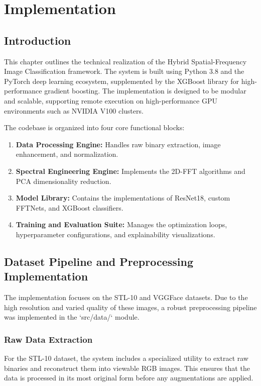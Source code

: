 \chapter{Implementation}
\label{ch:implementation}

\section{Introduction}

This chapter outlines the technical realization of the Hybrid Spatial-Frequency Image Classification framework. The system is built using Python 3.8 and the PyTorch deep learning ecosystem, supplemented by the XGBoost library for high-performance gradient boosting. The implementation is designed to be modular and scalable, supporting remote execution on high-performance GPU environments such as NVIDIA V100 clusters.

The codebase is organized into four core functional blocks:
\begin{enumerate}
    \item \textbf{Data Processing Engine:} Handles raw binary extraction, image enhancement, and normalization.
    \item \textbf{Spectral Engineering Engine:} Implements the 2D-FFT algorithms and PCA dimensionality reduction.
    \item \textbf{Model Library:} Contains the implementations of ResNet18, custom FFTNets, and XGBoost classifiers.
    \item \textbf{Training and Evaluation Suite:} Manages the optimization loops, hyperparameter configurations, and explainability visualizations.
\end{enumerate}

\section{Dataset Pipeline and Preprocessing Implementation}

The implementation focuses on the STL-10 and VGGFace datasets. Due to the high resolution and varied quality of these images, a robust preprocessing pipeline was implemented in the `src/data/` module.

\subsection{Raw Data Extraction}
For the STL-10 dataset, the system includes a specialized utility to extract raw binaries and reconstruct them into viewable RGB images. This ensures that the data is processed in its most original form before any augmentations are applied.

